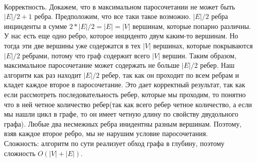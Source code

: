 \documentclass[12pt]{extreport}
\theoremstyle{definiton}
\theoremstyle{definition}
\theoremstyle{definition}
\begin{document}
	\\Корректность. Докажем, что в максимальном паросочетании не может быть $|E|/2 + 1$ ребра. Предположим, что все таки такое возможно. $|E|/2$ ребра инцинденты в сумме $2*|E|/2=|E|=|V|$ вершинам, которые попарно различны. У нас есть еще одно ребро, которое инциденто двум каким-то вершинам. Но тогда эти две вершины уже содержатся в тех $|V|$ вершинах, которые покрываются $|E|/2$ ребрами, потому что граф содержит всего $|V|$ вершин. Таким образом, максимальное паросочетание может содержать не больше $|E|/2$ ребер. Наш алгоритм как раз находит $|E|/2$ ребер, так как он проходит по всем ребрам и кладет каждое второе в паросочетание. Это дает корректный результат, так как если рассмотреть последовательность ребер, которые мы проходим, то понятно что в ней четное количество ребер(так как всего ребер четное количество, а если мы нашли цикл в графе, то он имеет четную длину по свойству двудольного графа). Любые два несмежных ребра инидентны разным вершинам. Поэтому, взяв каждое второе ребро, мы не нарушим условие паросочетания.
	\\Сложность: алгоритм по сути реализует обход графа в глубину, поэтому сложность $O(|V|+|E|)$.
	
\end{document}
